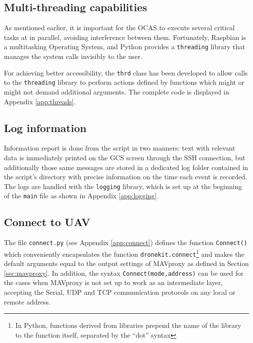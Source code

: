 \subsection{Multi-threading capabilities}

As mentioned earlier, it is important for the OCAS to execute several critical tasks at in parallel, avoiding interference between them.
Fortunately, Raspbian is a multitasking Operating System, and Python provides a \texttt{threading} library that manages the system calls invisibly to the user.

For achieving better accessibility, the \texttt{thrd} class has been developed to allow calls to the \texttt{threading} library to perform actions defined by functions which might or might not demand additional arguments.
The complete code is displayed in Appendix \ref{app:threads}.

\subsection{Log information} \label{sec:logging}

Information report is done from the script in two manners:
text with relevant data is immediately printed on the GCS screen through the SSH connection, but additionally those same messages are stored in a dedicated log folder contained in the script's directory with precise information on the time each event is recorded.
The logs are handled with the \texttt{logging} library, which is set up at the beginning of the \texttt{main} file as shown in Appendix \ref{app:logging}.

\subsection{Connect to UAV} \label{sec:connect}

The file \texttt{connect.py} (see Appendix \ref{app:connect}) defines the function \texttt{Connect()} which conveniently encapsulates the function \texttt{dronekit.connect}\footnote{In Python, functions derived from libraries prepend the name of the library to the function itself, separated by the ``dot'' syntax} and makes the default arguments equal to the output settings of MAVproxy as defined in Section \ref{sec:mavproxy}.
In addition, the syntax \texttt{Connect(mode,address)} can be used for the cases when MAVproxy is not set up to work as an intermediate layer, accepting the Serial, UDP and TCP communication protocols on any local or remote address.

